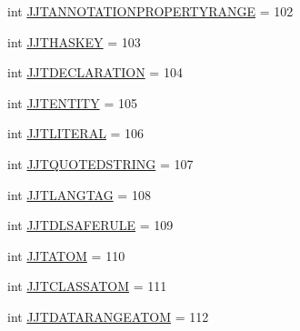 \begin{DoxyCompactItemize}
\item 
int \hyperlink{interfaceorg_1_1coode_1_1owlapi_1_1functionalparser_1_1_o_w_l_functional_syntax_parser_tree_constants_a678323917f27480c57a558d596dd7c62}{J\-J\-T\-A\-N\-N\-O\-T\-A\-T\-I\-O\-N\-P\-R\-O\-P\-E\-R\-T\-Y\-R\-A\-N\-G\-E} = 102
\item 
int \hyperlink{interfaceorg_1_1coode_1_1owlapi_1_1functionalparser_1_1_o_w_l_functional_syntax_parser_tree_constants_aca7a90cbeda9a0932451241acc8fb29c}{J\-J\-T\-H\-A\-S\-K\-E\-Y} = 103
\item 
int \hyperlink{interfaceorg_1_1coode_1_1owlapi_1_1functionalparser_1_1_o_w_l_functional_syntax_parser_tree_constants_a8f759569c76abcafd9d0a5ea6e2314d9}{J\-J\-T\-D\-E\-C\-L\-A\-R\-A\-T\-I\-O\-N} = 104
\item 
int \hyperlink{interfaceorg_1_1coode_1_1owlapi_1_1functionalparser_1_1_o_w_l_functional_syntax_parser_tree_constants_a8b0138c3996f6a9decb15249e2107adf}{J\-J\-T\-E\-N\-T\-I\-T\-Y} = 105
\item 
int \hyperlink{interfaceorg_1_1coode_1_1owlapi_1_1functionalparser_1_1_o_w_l_functional_syntax_parser_tree_constants_a451c77e940b3d5163f25fe3f029f819c}{J\-J\-T\-L\-I\-T\-E\-R\-A\-L} = 106
\item 
int \hyperlink{interfaceorg_1_1coode_1_1owlapi_1_1functionalparser_1_1_o_w_l_functional_syntax_parser_tree_constants_a241630f86693b4ac2d62d10cd3c07560}{J\-J\-T\-Q\-U\-O\-T\-E\-D\-S\-T\-R\-I\-N\-G} = 107
\item 
int \hyperlink{interfaceorg_1_1coode_1_1owlapi_1_1functionalparser_1_1_o_w_l_functional_syntax_parser_tree_constants_a20c63b141283ec9502d2e75c0068ffa1}{J\-J\-T\-L\-A\-N\-G\-T\-A\-G} = 108
\item 
int \hyperlink{interfaceorg_1_1coode_1_1owlapi_1_1functionalparser_1_1_o_w_l_functional_syntax_parser_tree_constants_a44624d90586ab5e658ebb45dcb79d30f}{J\-J\-T\-D\-L\-S\-A\-F\-E\-R\-U\-L\-E} = 109
\item 
int \hyperlink{interfaceorg_1_1coode_1_1owlapi_1_1functionalparser_1_1_o_w_l_functional_syntax_parser_tree_constants_a039c851bd23748774f498287fec6ebda}{J\-J\-T\-A\-T\-O\-M} = 110
\item 
int \hyperlink{interfaceorg_1_1coode_1_1owlapi_1_1functionalparser_1_1_o_w_l_functional_syntax_parser_tree_constants_adc419ec5e9f66c825ec436f499e7e377}{J\-J\-T\-C\-L\-A\-S\-S\-A\-T\-O\-M} = 111
\item 
int \hyperlink{interfaceorg_1_1coode_1_1owlapi_1_1functionalparser_1_1_o_w_l_functional_syntax_parser_tree_constants_a3ae708b732cc3fdde4a0c041fb701ae0}{J\-J\-T\-D\-A\-T\-A\-R\-A\-N\-G\-E\-A\-T\-O\-M} = 112

\end{DoxyCompactItemize}
